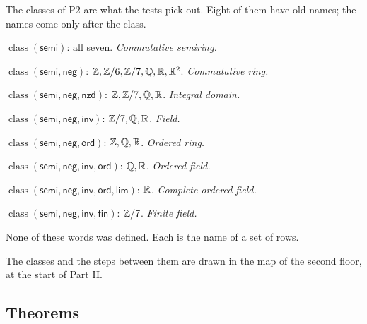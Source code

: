 The classes of P2 are what the tests pick out. Eight of them have old names; the names come only after the class.
\begin{lines}
\item[\lab{N1}] $\operatorname{class}(\mathsf{semi})$: all seven. \emph{Commutative semiring.}
\item[\lab{N2}] $\operatorname{class}(\mathsf{semi}, \mathsf{neg})$: $\mathbb{Z}, \mathbb{Z}/6, \mathbb{Z}/7, \mathbb{Q}, \mathbb{R}, \mathbb{R}^2$. \emph{Commutative ring.}
\item[\lab{N3}] $\operatorname{class}(\mathsf{semi}, \mathsf{neg}, \mathsf{nzd})$: $\mathbb{Z}, \mathbb{Z}/7, \mathbb{Q}, \mathbb{R}$. \emph{Integral domain.}
\item[\lab{N4}] $\operatorname{class}(\mathsf{semi}, \mathsf{neg}, \mathsf{inv})$: $\mathbb{Z}/7, \mathbb{Q}, \mathbb{R}$. \emph{Field.}
\item[\lab{N5}] $\operatorname{class}(\mathsf{semi}, \mathsf{neg}, \mathsf{ord})$: $\mathbb{Z}, \mathbb{Q}, \mathbb{R}$. \emph{Ordered ring.}
\item[\lab{N6}] $\operatorname{class}(\mathsf{semi}, \mathsf{neg}, \mathsf{inv}, \mathsf{ord})$: $\mathbb{Q}, \mathbb{R}$. \emph{Ordered field.}
\item[\lab{N7}] $\operatorname{class}(\mathsf{semi}, \mathsf{neg}, \mathsf{inv}, \mathsf{ord}, \mathsf{lim})$: $\mathbb{R}$. \emph{Complete ordered field.}
\item[\lab{N8}] $\operatorname{class}(\mathsf{semi}, \mathsf{neg}, \mathsf{inv}, \mathsf{fin})$: $\mathbb{Z}/7$. \emph{Finite field.}
\end{lines}
None of these words was defined. Each is the name of a set of rows.

The classes and the steps between them are drawn in the map of the second floor, at the start of Part II.

\subsection*{Theorems}

